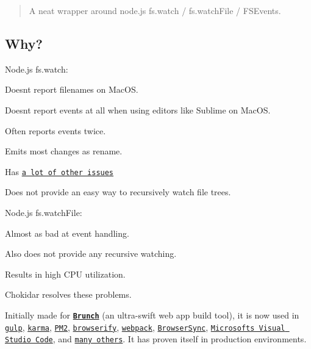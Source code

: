 \begin{quote}
A neat wrapper around node.\+js fs.\+watch / fs.\+watch\+File / F\+S\+Events. \end{quote}


\href{https://www.npmjs.com/package/chokidar}{\tt }

\subsection*{Why?}

Node.\+js {\ttfamily fs.\+watch}\+:


\begin{DoxyItemize}
\item Doesn\textquotesingle{}t report filenames on Mac\+OS.
\item Doesn\textquotesingle{}t report events at all when using editors like Sublime on Mac\+OS.
\item Often reports events twice.
\item Emits most changes as {\ttfamily rename}.
\item Has \href{https://github.com/nodejs/node/search?q=fs.watch&type=Issues}{\tt a lot of other issues}
\item Does not provide an easy way to recursively watch file trees.
\end{DoxyItemize}

Node.\+js {\ttfamily fs.\+watch\+File}\+:


\begin{DoxyItemize}
\item Almost as bad at event handling.
\item Also does not provide any recursive watching.
\item Results in high C\+PU utilization.
\end{DoxyItemize}

Chokidar resolves these problems.

Initially made for {\bfseries \href{http://brunch.io}{\tt Brunch}} (an ultra-\/swift web app build tool), it is now used in \href{https://github.com/gulpjs/gulp/}{\tt gulp}, \href{http://karma-runner.github.io}{\tt karma}, \href{https://github.com/Unitech/PM2}{\tt P\+M2}, \href{http://browserify.org/}{\tt browserify}, \href{http://webpack.github.io/}{\tt webpack}, \href{http://www.browsersync.io/}{\tt Browser\+Sync}, \href{https://github.com/microsoft/vscode}{\tt Microsoft\textquotesingle{}s Visual Studio Code}, and \href{https://www.npmjs.org/browse/depended/chokidar/}{\tt many others}. It has proven itself in production environments.

